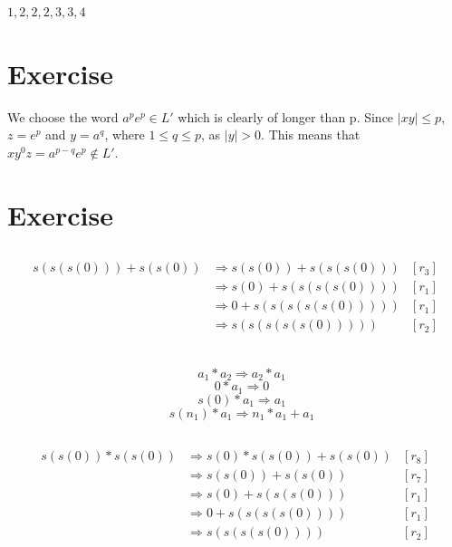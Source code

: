 \documentclass[12pt]{article}
\begin{document}
$1,2,2,2,3,3,4$

\section{Exercise}
We choose the word $a^pe^p \in L'$ which is clearly of longer than p. Since $|xy| \leq p$, $z = e^p$ and $y = a^q$, where $1 \leq q \leq p$, as $|y| > 0$. This means that $xy^0z = a^{p-q}e^p \notin L'$.

\section{Exercise}
\subsection{}
\begin{align*}
        s(s(s(0))) + s(s(0)) & \Rightarrow s(s(0)) + s(s(s(0))) & [r_3] \\
                             & \Rightarrow s(0) + s(s(s(s(0)))) & [r_1] \\
                             & \Rightarrow 0 + s(s(s(s(s(0))))) & [r_1] \\
                             & \Rightarrow s(s(s(s(s(0)))))     & [r_2] \\
\end{align*}

\subsection{}
\begin{equation}
        [r_5] \quad a_1 * a_2 \Rightarrow a_2 * a_1
\end{equation}
\begin{equation}
        [r_6] \quad 0 * a_1 \Rightarrow 0
\end{equation}
\begin{equation}
        [r_7] \quad s(0) * a_1 \Rightarrow a_1
\end{equation}
\begin{equation}
        [r_8] \quad s(n_1) * a_1 \Rightarrow n_1 * a_1 + a_1
\end{equation}

\subsection{}
\begin{align*}
        s(s(0)) * s(s(0)) & \Rightarrow s(0) * s(s(0)) + s(s(0)) & [r_8] \\
                          & \Rightarrow s(s(0)) + s(s(0))        & [r_7] \\
                          & \Rightarrow s(0) + s(s(s(0)))        & [r_1] \\
                          & \Rightarrow 0 + s(s(s(s(0))))        & [r_1] \\
                          & \Rightarrow s(s(s(s(0))))            & [r_2] \\
\end{align*}
\end{document}
